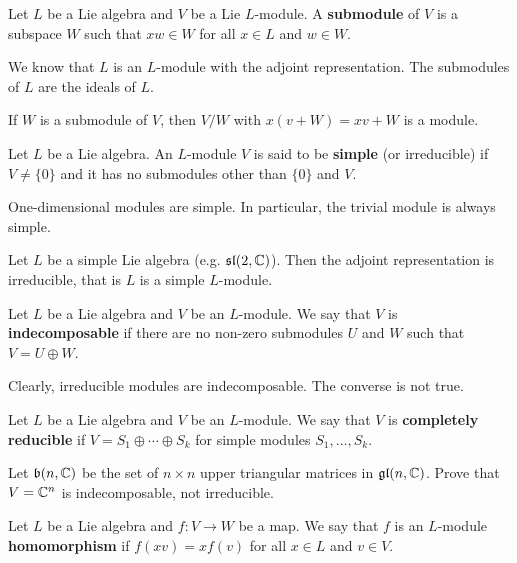 \begin{definition}
    Let $L$ be a Lie algebra and $V$ be a Lie $L$-module. 
    A \textbf{submodule} of $V$ is a subspace $W$ 
    such that $xw\in W$ for all $x\in L$ and $w\in W$. 
\end{definition}

\begin{example}
We know that $L$ is an $L$-module 
with the adjoint representation. The submodules of $L$ are
the ideals of $L$. 
\end{example}

If $W$ is a submodule of $V$, then $V/W$ 
with $x(v+W)=xv+W$ is a module. 

\begin{definition}
    Let $L$ be a Lie algebra. An $L$-module $V$ 
    is said to be \textbf{simple} (or irreducible) 
    if $V\ne \{0\}$ and it has no submodules other than $\{0\}$ and $V$. 
\end{definition}

One-dimensional modules are simple. In particular, 
the trivial module is always simple. 

\begin{example}
    Let $L$ be a simple Lie algebra (e.g. $\mathfrak{sl}(2,\mathbb{C})$). Then 
    the adjoint representation is irreducible, that is $L$ is a simple $L$-module.  
\end{example}

\begin{definition}
    Let $L$ be a Lie algebra and $V$ be an $L$-module. We say 
    that $V$ is \textbf{indecomposable} if 
    there are no non-zero submodules $U$ and $W$ such that
    $V=U\oplus W$.
\end{definition}

Clearly, irreducible modules are indecomposable. 
The converse is not true.

\begin{definition}
    Let $L$ be a Lie algebra and $V$ be an $L$-module. We say that
    $V$ is \textbf{completely reducible} if $V=S_1\oplus\cdots\oplus S_k$
    for simple modules $S_1,\dots,S_k$. 
\end{definition}

\begin{exercise}
    Let $\mathfrak{b}(n,\mathbb{C})$ be the set of $n\times n$ 
    upper triangular 
    matrices in $\mathfrak{gl}(n,\mathbb{C})$. Prove that $V=\mathbb{C}^n$ is indecomposable,  
    not irreducible. 
\end{exercise}

\begin{definition}
    Let $L$ be a Lie algebra and $f\colon V\to W$ be a map. 
    We say that $f$ is an $L$-module \textbf{homomorphism} if
    $f(xv)=xf(v)$ for all $x\in L$ and $v\in V$. 
\end{definition}

